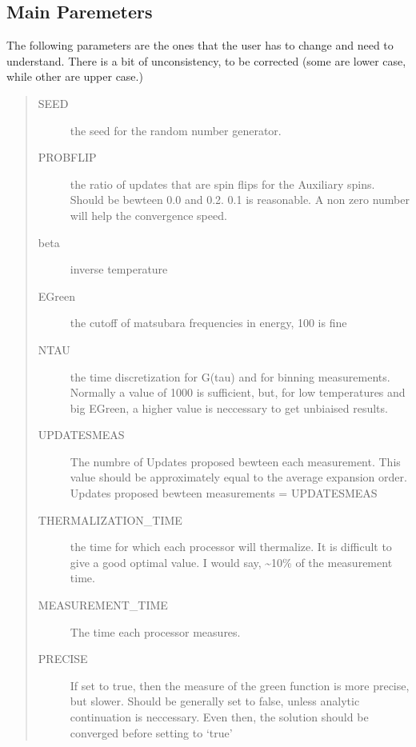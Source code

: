 \documentclass[letterpaper,10pt,english]{sphinxmanual}
\begin{document}
\subsection{Main Paremeters}
\label{\detokenize{params:main-paremeters}}
The following parameters are the ones that the user has to change and need to understand. There is a bit of unconsistency, to be corrected
(some are lower case, while other are upper case.)
\begin{quote}
\begin{description}
\item[{SEED}] \leavevmode
the seed for the random number generator.

\item[{PROBFLIP}] \leavevmode
the ratio of updates that are spin flips for the Auxiliary spins. Should be bewteen 0.0 and 0.2. 0.1 is reasonable.
A non zero number will help the convergence speed.

\item[{beta}] \leavevmode
inverse temperature

\item[{EGreen}] \leavevmode
the cutoff of matsubara frequencies in energy, 100 is fine

\item[{NTAU}] \leavevmode
the time discretization for G(tau) and for binning measurements. Normally
a value of 1000 is sufficient, but, for low temperatures and big EGreen,
a higher value is neccessary to get unbiaised results.

\item[{UPDATESMEAS}] \leavevmode
The numbre of Updates proposed bewteen each measurement.
This value should be approximately equal to the average expansion order.
Updates proposed bewteen measurements = UPDATESMEAS

\item[{THERMALIZATION\_TIME}] \leavevmode
the time for which each processor will thermalize. It is difficult to give a good
optimal value. I would say, \textasciitilde{}10\% of the measurement time.

\item[{MEASUREMENT\_TIME}] \leavevmode
The time each processor measures.

\item[{PRECISE}] \leavevmode
If set to true, then the measure of the green function is more precise, but slower. Should be generally set to false,
unless analytic continuation is neccessary. Even then, the solution should be converged before setting to `true'

\end{description}
\end{quote}
\end{document}
